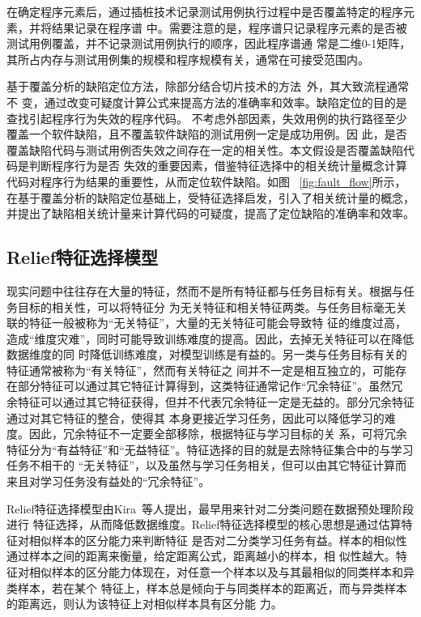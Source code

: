 在确定程序元素后，通过插桩技术记录测试用例执行过程中是否覆盖特定的程序元素，并将结果记录在程序谱
中。需要注意的是，程序谱只记录程序元素的是否被测试用例覆盖，并不记录测试用例执行的顺序，因此程序谱通
常是二维0-1矩阵，其所占内存与测试用例集的规模和程序规模有关，通常在可接受范围内。

基于覆盖分析的缺陷定位方法，除部分结合切片技术的方法~\cite{conslice2013,wen2013}外，其大致流程通常不
变，通过改变可疑度计算公式来提高方法的准确率和效率。缺陷定位的目的是查找引起程序行为失效的程序代码。
不考虑外部因素，失效用例的执行路径至少覆盖一个软件缺陷，且不覆盖软件缺陷的测试用例一定是成功用例。因
此，是否覆盖缺陷代码与测试用例否失效之间存在一定的相关性。本文假设是否覆盖缺陷代码是判断程序行为是否
失效的重要因素，借鉴特征选择中的相关统计量概念计算代码对程序行为结果的重要性，从而定位软件缺陷。如图
~\ref{fig:fault_flow}所示，在基于覆盖分析的缺陷定位基础上，受特征选择启发，引入了相关统计量的概念，
并提出了缺陷相关统计量来计算代码的可疑度，提高了定位缺陷的准确率和效率。

\subsection{Relief特征选择模型}

现实问题中往往存在大量的特征，然而不是所有特征都与任务目标有关。根据与任务目标的相关性，可以将特征分
为无关特征和相关特征两类。与任务目标毫无关联的特征一般被称为``无关特征''，大量的无关特征可能会导致特
征的维度过高，造成``维度灾难''，同时可能导致训练难度的提高。因此，去掉无关特征可以在降低数据维度的同
时降低训练难度，对模型训练是有益的。另一类与任务目标有关的特征通常被称为``有关特征''，然而有关特征之
间并不一定是相互独立的，可能存在部分特征可以通过其它特征计算得到，这类特征通常记作``冗余特征''。虽然冗
余特征可以通过其它特征获得，但并不代表冗余特征一定是无益的。部分冗余特征通过对其它特征的整合，使得其
本身更接近学习任务，因此可以降低学习的难度。因此，冗余特征不一定要全部移除，根据特征与学习目标的关
系，可将冗余特征分为``有益特征''和``无益特征''。特征选择的目的就是去除特征集合中的与学习任务不相干的
``无关特征''，以及虽然与学习任务相关，但可以由其它特征计算而来且对学习任务没有益处的``冗余特征''。

Relief特征选择模型由Kira~\cite{kira1992feature}等人提出，最早用来针对二分类问题在数据预处理阶段进行
特征选择，从而降低数据维度。Relief特征选择模型的核心思想是通过估算特征对相似样本的区分能力来判断特征
是否对二分类学习任务有益。样本的相似性通过样本之间的距离来衡量，给定距离公式，距离越小的样本，相
似性越大。特征对相似样本的区分能力体现在，对任意一个样本以及与其最相似的同类样本和异类样本，若在某个
特征上，样本总是倾向于与同类样本的距离近，而与异类样本的距离远，则认为该特征上对相似样本具有区分能
力。

